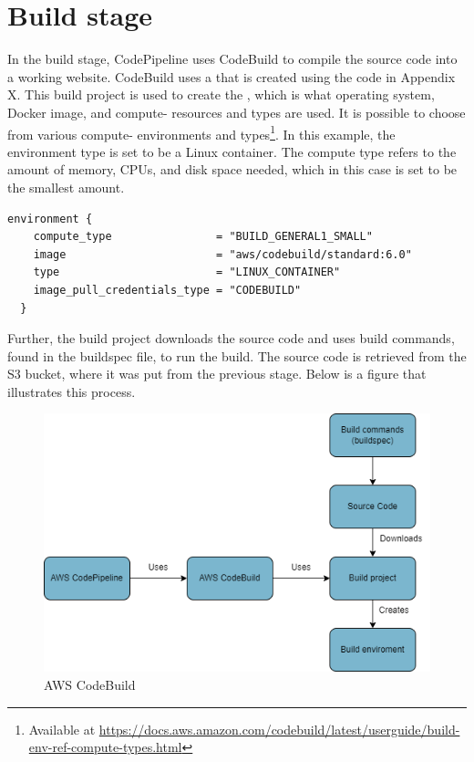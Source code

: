 \section{Build stage}
In the build stage, CodePipeline uses CodeBuild to compile the source code into a working website. CodeBuild uses a  that is created using the code in Appendix X. This build project is used to create the , which is what operating system, Docker image, and compute- resources and types are used.  It is possible to choose from various compute- environments and types\footnote{Available at \url{https://docs.aws.amazon.com/codebuild/latest/userguide/build-env-ref-compute-types.html}}. In this example, the environment type is set to be a Linux container. The compute type refers to the amount of memory, CPUs, and disk space needed, which in this case is set to be the smallest amount. 

\begin{tcolorbox}
\begin{verbatim}
environment {
    compute_type                = "BUILD_GENERAL1_SMALL"
    image                       = "aws/codebuild/standard:6.0"
    type                        = "LINUX_CONTAINER"
    image_pull_credentials_type = "CODEBUILD"
  }
\end{verbatim}
\end{tcolorbox}

Further, the build project downloads the source code and uses build commands, found in the \gls{buildspec} file, to run the build. The source code is retrieved from the S3 bucket, where it was put from the previous stage. \cite{CodeBuildProcess} Below is a figure that illustrates this process.
\vspace{2mm}
\begin{figure}[H]
    \centering
    \includegraphics[scale=0.4]{Images/CodeBuild.drawio.png}
    \caption{AWS CodeBuild} 
    \label{fig: AWS CodeBuild}
\end{figure}

